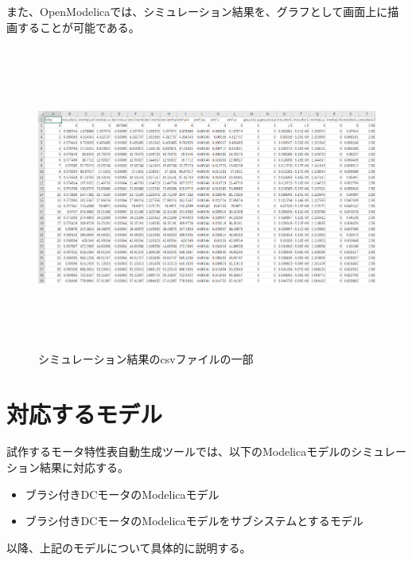 また、OpenModelicaでは、シミュレーション結果を、グラフとして画面上に描画することが可能である。
\begin{figure}[t]
	\centering
	\includegraphics[width=16.5cm,height=10cm]{./Image/simyu_csv.png}
	\caption{シミュレーション結果のcsvファイルの一部}
	\label{fig:simyu_csv}
\end{figure}

\section{対応するモデル}\label{taioumodel}
試作するモータ特性表自動生成ツールでは、以下のModelicaモデルのシミュレーション結果に対応する。
\begin{itemize}
	\item ブラシ付きDCモータのModelicaモデル
	\item ブラシ付きDCモータのModelicaモデルをサブシステムとするモデル
\end{itemize}
以降、上記のモデルについて具体的に説明する。

